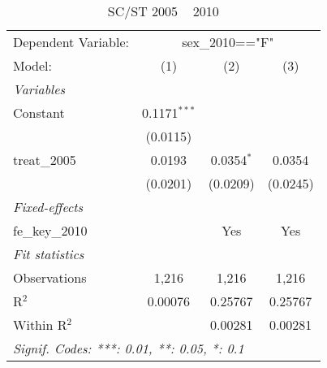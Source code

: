 
\begin{table}[htbp]
   \caption{SC/ST 2005 ~ 2010}
   \centering
   \begin{tabular}{lccc}
      \tabularnewline \midrule \midrule
      Dependent Variable: & \multicolumn{3}{c}{sex\_2010=="F"}\\
      Model:          & (1)            & (2)          & (3)\\  
      \midrule
      \emph{Variables}\\
      Constant        & 0.1171$^{***}$ &              &   \\   
                      & (0.0115)       &              &   \\   
      treat\_2005     & 0.0193         & 0.0354$^{*}$ & 0.0354\\   
                      & (0.0201)       & (0.0209)     & (0.0245)\\   
      \midrule
      \emph{Fixed-effects}\\
      fe\_key\_2010   &                & Yes          & Yes\\  
      \midrule
      \emph{Fit statistics}\\
      Observations    & 1,216          & 1,216        & 1,216\\  
      R$^2$           & 0.00076        & 0.25767      & 0.25767\\  
      Within R$^2$    &                & 0.00281      & 0.00281\\  
      \midrule \midrule
      \multicolumn{4}{l}{\emph{Signif. Codes: ***: 0.01, **: 0.05, *: 0.1}}\\
   \end{tabular}
\end{table}


